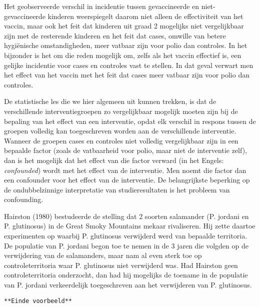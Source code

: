 \documentclass[12pt,dutch,coursenotes]{book}
\theoremstyle{definition}
\theoremstyle{definition}
\theoremstyle{definition}
\theoremstyle{remark}
\let\BeginKnitrBlock\begin \let\EndKnitrBlock\end
\begin{document}
Het geobserveerde verschil in incidentie tussen gevaccineerde en
niet-gevaccineerde kinderen weerspiegelt daarom niet alleen de
effectiviteit van het vaccin, maar ook het feit dat kinderen uit graad 2
mogelijks niet vergelijkbaar zijn met de resterende kinderen en het feit
dat cases, omwille van betere hygiënische omstandigheden, meer vatbaar
zijn voor polio dan controles. In het bijzonder is het om die reden
mogelijk om, zelfs als het vaccin effectief is, een gelijke incidentie
voor cases en controles vast te stellen. In dat geval verwart men het
effect van het vaccin met het feit dat cases meer vatbaar zijn voor
polio dan controles.

De statistische les die we hier algemeen uit kunnen trekken, is dat de
verschillende interventiegroepen zo vergelijkbaar mogelijk moeten zijn
bij de bepaling van het effect van een interventie, opdat elk verschil
in respons tussen de groepen volledig kan toegeschreven worden aan de
verschillende interventie. Wanneer de groepen cases en controles niet
volledig vergelijkbaar zijn in een bepaalde factor (zoals de vatbaarheid
voor polio, maar niet de interventie zelf), dan is het mogelijk dat het
effect van die factor verward (in het Engels: \emph{confounded}) wordt
met het effect van de interventie. Men noemt die factor dan een
confounder voor het effect van de interventie. De belangrijkste
beperking op de ondubbelzinnige interpretatie van studieresultaten is
het probleem van confounding.

\BeginKnitrBlock{example}[De nood aan controle]
\protect\hypertarget{exm:unnamed-chunk-12}{}{\label{exm:unnamed-chunk-12}
\iffalse (De nood aan controle) \fi{} }
\EndKnitrBlock{example} Hairston (1980) bestudeerde de stelling dat 2
soorten salamander (P. jordani en P. glutinosus) in de Great Smoky
Mountains mekaar rivaliseren. Hij zette daartoe experimenten op waarbij
P. glutinosus verwijderd werd van bepaalde territoria. De populatie van
P. jordani begon toe te nemen in de 3 jaren die volgden op de
verwijdering van de salamanders, maar nam al even sterk toe op
controleterritoria waar P. glutinosus niet verwijderd was. Had Hairston
geen controleterritoria onderzocht, dan had hij mogelijks de toename in
de populatie van P. jordani verkeerdelijk toegeschreven aan het
verwijderen van P. glutinosus.

\texttt{**Einde\ voorbeeld**}
\end{document}
